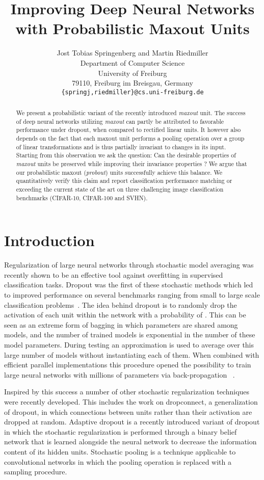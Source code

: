 \documentclass{article} \pdfoutput=1
\title{Improving Deep Neural Networks with
  Probabilistic Maxout Units}
\author{
 Jost Tobias Springenberg and Martin Riedmiller\\
 Department of Computer Science\\
 University of Freiburg \\
 79110, Freiburg im Breisgau, Germany \\
 \texttt{\{springj,riedmiller\}@cs.uni-freiburg.de} \\
 }
\begin{document}
\maketitle

\begin{abstract}
  We present a probabilistic variant of the recently introduced
  \emph{maxout} unit. The success of deep neural networks utilizing
  \emph{maxout} can partly be attributed to favorable performance
  under dropout, when compared to rectified linear units. It however
  also depends on the fact that each maxout unit performs a pooling
  operation over a group of linear transformations and is thus
  partially invariant to changes in its input. Starting from this
  observation we ask the question: Can the desirable properties of
  \emph{maxout} units be preserved while improving their invariance
  properties ? We argue that our probabilistic maxout (\emph{probout})
  units successfully achieve this balance. We quantitatively verify
  this claim and report classification performance matching or
  exceeding the current state of the art on three challenging image
  classification benchmarks (CIFAR-10, CIFAR-100 and SVHN).
\end{abstract}

\section{Introduction}
Regularization of large neural networks through stochastic model
averaging was recently shown to be an effective tool against
overfitting in supervised classification tasks. Dropout
\cite{Hinton2012} was the first of these stochastic methods which led
to improved performance on several benchmarks ranging from small to
large scale classification
problems~\cite{Krizhevsky2012,Hinton2012}. The idea behind
dropout is to randomly drop the activation of each unit within the
network with a probability of . This can be seen as an extreme
form of bagging in which parameters are shared among models, and the
number of trained models is exponential in the number of these model
parameters. During testing an approximation is used to average over
this large number of models without instantiating each of them.  When
combined with efficient parallel implementations this procedure opened
the possibility to train large neural networks with millions of
parameters via back-propagation \cite{Krizhevsky2012, Zeiler2013}~.

Inspired by this success a number of other stochastic regularization
techniques were recently developed. This includes the work on
dropconnect\cite{WanLi2013}, a generalization of dropout, in which
connections between units rather than their activation are dropped at
random. Adaptive dropout \cite{Frey2013} is a recently introduced
variant of dropout in which the stochastic regularization is performed
through a binary belief network that is learned alongside the neural
network to decrease the information content of its hidden units.
Stochastic pooling \cite{ZeilerStochastic2013} is a technique
applicable to convolutional networks in which the pooling operation is
replaced with a sampling procedure.
\end{document}
